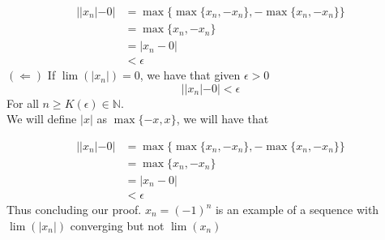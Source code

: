 \documentclass{article}
\begin{document}
\begin{align*}
    ||x_n| - 0| & = \max\{\max\{x_n, -x_n\}, -\max\{x_n, -x_n\}\} \\
                & = \max\{x_n, -x_n\} \\
                & = |x_n - 0| \\
                & < \epsilon
\end{align*} 
$(\Longleftarrow)$  If $\lim(|x_n|) = 0$, we have that given $\epsilon > 0$ 
\begin{equation*}
    ||x_n| - 0| < \epsilon 
\end{equation*}
For all $n \ge K(\epsilon) \in \mathbb{N}$.
\\
We will define $|x|$ as $\max\{-x, x\}$, we will have that

\begin{align*}
    ||x_n| - 0| & = \max\{\max\{x_n, -x_n\}, -\max\{x_n, -x_n\}\} \\
                & = \max\{x_n, -x_n\} \\
                & = |x_n - 0| \\
                & < \epsilon
\end{align*} 
Thus concluding our proof. $x_n = (-1)^n$ is an example of a sequence with $\lim(|x_n|)$ converging but not $\lim(x_n)$
\end{document}
